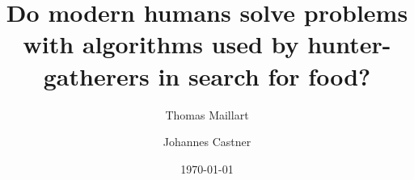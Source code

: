 \documentclass[12pt]{revtex4}
\begin{document}
\title{Do modern humans solve problems with algorithms used by hunter-gatherers in search for food?}

\author{Thomas Maillart}

\author{Johannes Castner}


\date{\today}


\begin{abstract}

\end{abstract}

\maketitle






%



\clearpage
%




\clearpage
%

\renewcommand\thesection{S\arabic{section}}
\setcounter{section}{0}

\renewcommand\theequation{S\arabic{equation}}
\setcounter{equation}{0}



%
%
%
%
\end{document}
